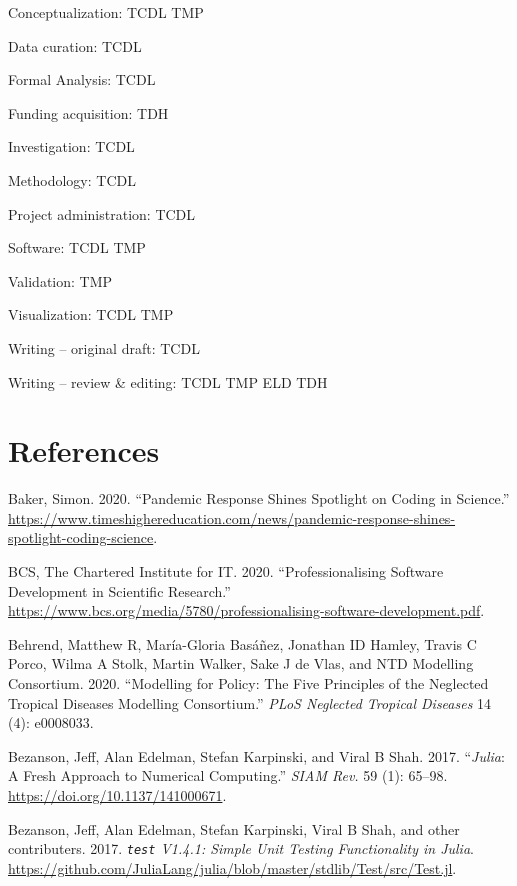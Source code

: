 \documentclass[]{elsarticle} %
\begin{document}
Conceptualization: TCDL TMP

Data curation: TCDL

Formal Analysis: TCDL

Funding acquisition: TDH

Investigation: TCDL

Methodology: TCDL

Project administration: TCDL

Software: TCDL TMP

Validation: TMP

Visualization: TCDL TMP

Writing -- original draft: TCDL

Writing -- review \& editing: TCDL TMP ELD TDH

\hypertarget{references}{%
\section*{References}\label{references}}

\hypertarget{refs}{}
\leavevmode\hypertarget{ref-funds}{}%
Baker, Simon. 2020. ``Pandemic Response Shines Spotlight on Coding in Science.'' \url{https://www.timeshighereducation.com/news/pandemic-response-shines-spotlight-coding-science}.

\leavevmode\hypertarget{ref-it}{}%
BCS, The Chartered Institute for IT. 2020. ``Professionalising Software Development in Scientific Research.'' \url{https://www.bcs.org/media/5780/professionalising-software-development.pdf}.

\leavevmode\hypertarget{ref-behrend2020modelling}{}%
Behrend, Matthew R, María-Gloria Basáñez, Jonathan ID Hamley, Travis C Porco, Wilma A Stolk, Martin Walker, Sake J de Vlas, and NTD Modelling Consortium. 2020. ``Modelling for Policy: The Five Principles of the Neglected Tropical Diseases Modelling Consortium.'' \emph{PLoS Neglected Tropical Diseases} 14 (4): e0008033.

\leavevmode\hypertarget{ref-bezanson2017julia}{}%
Bezanson, Jeff, Alan Edelman, Stefan Karpinski, and Viral B Shah. 2017. ``\emph{Julia}: A Fresh Approach to Numerical Computing.'' \emph{SIAM Rev.} 59 (1): 65--98. \url{https://doi.org/10.1137/141000671}.

\leavevmode\hypertarget{ref-juliatest}{}%
Bezanson, Jeff, Alan Edelman, Stefan Karpinski, Viral B Shah, and other contributers. 2017. \emph{\texttt{test} V1.4.1: Simple Unit Testing Functionality in Julia}. \url{https://github.com/JuliaLang/julia/blob/master/stdlib/Test/src/Test.jl}.
\end{document}
